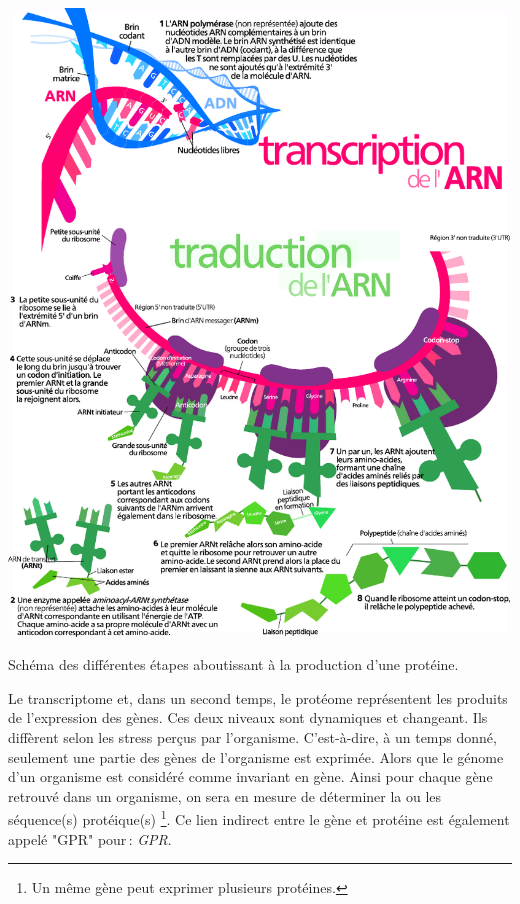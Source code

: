 \begin{refsection}
    \begin{shadedfigure}
        \centering
        \includegraphics[width=\textwidth]{img/production_proteine2.pdf}
        \caption{Schéma des différentes étapes aboutissant à la production d’une protéine.}
        \label{fig:production_proteine}
    \end{shadedfigure}
    
    Le transcriptome et, dans un second temps, le protéome représentent les produits de l'expression des gènes. Ces deux niveaux sont dynamiques et changeant. Ils diffèrent selon les stress perçus par l'organisme. C'est-à-dire, à un temps donné, seulement une partie des gènes de l'organisme est exprimée. Alors que le génome d'un organisme est considéré comme invariant en gène. Ainsi pour chaque gène retrouvé dans un organisme, on sera en mesure de déterminer la ou les séquence(s) protéique(s) \footnote{Un même gène peut exprimer plusieurs protéines.}. Ce lien indirect entre le gène et protéine est également appelé "\acrshort{GPR}" pour : \textit{\acrfull{GPR}}.
    

\end{refsection}
